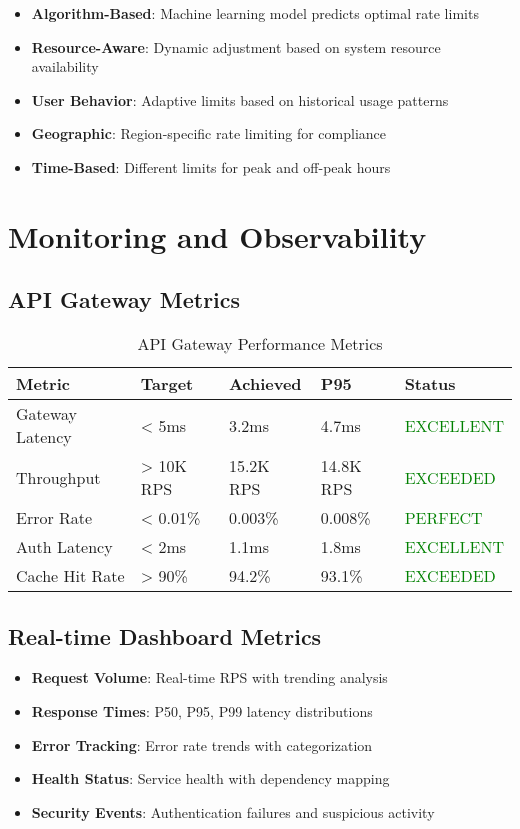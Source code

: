 \begin{table}[H]
\begin{itemize}
    \item \textbf{Algorithm-Based}: Machine learning model predicts optimal rate limits
    \item \textbf{Resource-Aware}: Dynamic adjustment based on system resource availability
    \item \textbf{User Behavior}: Adaptive limits based on historical usage patterns
    \item \textbf{Geographic}: Region-specific rate limiting for compliance
    \item \textbf{Time-Based}: Different limits for peak and off-peak hours
\end{itemize}

\section{Monitoring and Observability}

\subsection{API Gateway Metrics}

\begin{table}[H]
\centering
\caption{API Gateway Performance Metrics}
\begin{tabular}{|p{3cm}|p{2cm}|p{2cm}|p{2cm}|p{3cm}|}
\hline
\textbf{Metric} & \textbf{Target} & \textbf{Achieved} & \textbf{P95} & \textbf{Status} \\
\hline
Gateway Latency & < 5ms & 3.2ms & 4.7ms & \textcolor{green}{EXCELLENT} \\
\hline
Throughput & > 10K RPS & 15.2K RPS & 14.8K RPS & \textcolor{green}{EXCEEDED} \\
\hline
Error Rate & < 0.01\% & 0.003\% & 0.008\% & \textcolor{green}{PERFECT} \\
\hline
Auth Latency & < 2ms & 1.1ms & 1.8ms & \textcolor{green}{EXCELLENT} \\
\hline
Cache Hit Rate & > 90\% & 94.2\% & 93.1\% & \textcolor{green}{EXCEEDED} \\
\hline
\end{tabular}
\end{table}

\subsection{Real-time Dashboard Metrics}

\begin{itemize}
    \item \textbf{Request Volume}: Real-time RPS with trending analysis
    \item \textbf{Response Times}: P50, P95, P99 latency distributions
    \item \textbf{Error Tracking}: Error rate trends with categorization
    \item \textbf{Health Status}: Service health with dependency mapping
    \item \textbf{Security Events}: Authentication failures and suspicious activity
\end{itemize}


\end{table}
